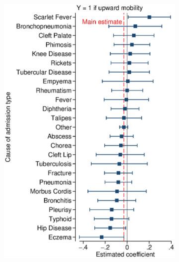 \documentclass[12pt,english]{article}
\begin{document}
\begin{figure}[!ht]
\caption[Effects of hospitalization by common causes of admission]{Effects of hospitalization by common causes of admission}
\centering
\begin{subfigure}{0.325\textwidth}
	\centering
	\includegraphics[width=1.00\linewidth]{../output/02_appendix/figure_a09_panel_1.eps}
\end{subfigure}
\begin{subfigure}{0.325\textwidth}
	\centering

\end{subfigure}
\end{figure}
\end{document}
